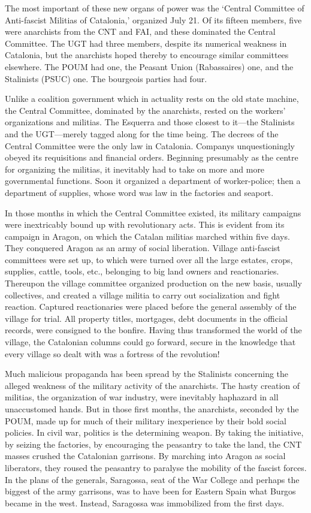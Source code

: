 The most important of these new organs of power was the ‘Central Committee of Anti-fascist Militias of Catalonia,' organized July 21. Of its fifteen members, five were anarchists from the CNT and FAI, and these dominated the Central Committee. The UGT had three members, despite its numerical weakness in Catalonia, but the anarchists hoped thereby to encourage similar committees elsewhere. The POUM had one, the Peasant Union (Rabassaires) one, and the Stalinists (PSUC) one. The bourgeois parties had four.

Unlike a coalition government which in actuality rests on the old state machine, the Central Committee, dominated by the anarchists, rested on the workers’ organizations and militias. The Esquerra and those closest to it---the Stalinists and the UGT---merely tagged along for the time being. The decrees of the Central Committee were the only law in Catalonia. Companys unquestioningly obeyed its requisitions and financial orders. Beginning presumably as the centre for organizing the militias, it inevitably had to take on more and more governmental functions. Soon it organized a department of worker-police; then a department of supplies, whose word was law in the factories and seaport.

In those months in which the Central Committee existed, its military campaigns were inextricably bound up with revolutionary acts. This is evident from its campaign in Aragon, on which the Catalan militias marched within five days. They conquered Aragon as an army of social liberation. Village anti-fascist committees were set up, to which were turned over all the large estates, crops, supplies, cattle, tools, etc., belonging to big land owners and reactionaries. Thereupon the village committee organized production on the new basis, usually collectives, and created a village militia to carry out socialization and fight reaction. Captured reactionaries were placed before the general assembly of the village for trial. All property titles, mortgages, debt documents in the official records, were consigned to the bonfire. Having thus transformed the world of the village, the Catalonian columns could go forward, secure in the knowledge that every village so dealt with was a fortress of the revolution!

Much malicious propaganda has been spread by the Stalinists concerning the alleged weakness of the military activity of the anarchists. The hasty creation of militias, the organization of war industry, were inevitably haphazard in all unaccustomed hands. But in those first months, the anarchists, seconded by the POUM, made up for much of their military inexperience by their bold social policies. In civil war, politics is the determining weapon. By taking the initiative, by seizing the factories, by encouraging the peasantry to take the land, the CNT masses crushed the Catalonian garrisons. By marching into Aragon as social liberators, they roused the peasantry to paralyse the mobility of the fascist forces. In the plans of the generals, Saragossa, seat of the War College and perhaps the biggest of the army garrisons, was to have been for Eastern Spain what Burgos became in the west. Instead, Saragossa was immobilized from the first days.

